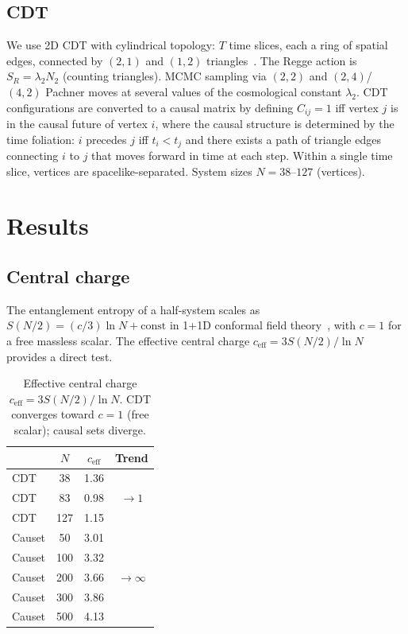 \documentclass[aps,prd,twocolumn,superscriptaddress,nofootinbib]{revtex4-2}
\begin{document}
\subsection{CDT}

We use 2D CDT with cylindrical topology: $T$ time slices, each a ring of spatial edges, connected by $(2,1)$ and $(1,2)$ triangles~\cite{ambjorn2001}. The Regge action is $S_R = \lambda_2 N_2$ (counting triangles). MCMC sampling via $(2,2)$ and $(2,4)$/$\!(4,2)$ Pachner moves at several values of the cosmological constant $\lambda_2$. CDT configurations are converted to a causal matrix by defining $C_{ij} = 1$ iff vertex $j$ is in the causal future of vertex $i$, where the causal structure is determined by the time foliation: $i$ precedes $j$ iff $t_i < t_j$ and there exists a path of triangle edges connecting $i$ to $j$ that moves forward in time at each step. Within a single time slice, vertices are spacelike-separated. System sizes $N = 38$--$127$ (vertices).

\section{Results}

\subsection{Central charge}

The entanglement entropy of a half-system scales as $S(N/2) = (c/3)\ln N + \text{const}$ in 1+1D conformal field theory~\cite{calabrese2004}, with $c = 1$ for a free massless scalar. The effective central charge $c_{\mathrm{eff}} = 3S(N/2)/\ln N$ provides a direct test.

\begin{table}[h]
\centering
\begin{tabular}{lccc}
\toprule
& $N$ & $c_{\mathrm{eff}}$ & Trend \\
\midrule
CDT & 38 & 1.36 & \\
CDT & 83 & 0.98 & $\to 1$ \\
CDT & 127 & 1.15 & \\
\midrule
Causet & 50 & 3.01 & \\
Causet & 100 & 3.32 & \\
Causet & 200 & 3.66 & $\to \infty$ \\
Causet & 300 & 3.86 & \\
Causet & 500 & 4.13 & \\
\bottomrule
\end{tabular}
\caption{Effective central charge $c_{\mathrm{eff}} = 3S(N/2)/\ln N$. CDT converges toward $c = 1$ (free scalar); causal sets diverge.}
\label{tab:central_charge}
\end{table}
\end{document}
